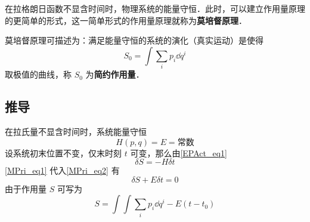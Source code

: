 在拉格朗日函数不显含时间时，物理系统的能量守恒．此时，可以建立作用量原理的更简单的形式，这一简单形式的作用量原理就称为\textbf{莫培督原理}．

莫培督原理可描述为：满足能量守恒的系统的演化（真实运动）是使得
\begin{equation}
S_0=\int\sum_i p_i\dd q^i
\end{equation}
取极值的曲线，称 $S_0$ 为\textbf{简约作用量}．
\subsection{推导}
在拉氏量不显含时间时，系统能量守恒
\begin{equation}\label{MPri_eq1}
H(p,q)=E=\text{常数}
\end{equation}
设系统初末位置不变，仅末时刻 $t$ 可变，那么由\autoref{EPAct_eq1}~
\begin{equation}\label{MPri_eq2}
\delta S=-H\delta t
\end{equation}
\autoref{MPri_eq1} 代入\autoref{MPri_eq2} 有
\begin{equation}
\delta S+E\delta t=0
\end{equation}
由于作用量 $S$ 可写为
\begin{equation}
S=\int \int\sum_i p_i\dd q^i-E(t-t_0)
\end{equation}
